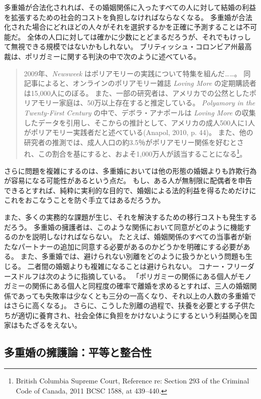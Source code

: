 \documentclass[paper=a4,book,openany]{jlreq}
\begin{document}
多重婚が合法化されれば、その婚姻関係に入ったすべての人に対して結婚の利益を拡張するための社会的コストを負担しなければならなくなる。
多重婚が合法化された場合にどれほどの人々がそれを選択するかを正確に予測することは不可能だ。
全体の人口に対しては確かに少数にとどまるだろうが、それでもけっして無視できる規模ではないかもしれない。
ブリティッシュ・コロンビア州最高裁は、ポリガミーに関する判決の中で次のように述べている。

\begin{quote}
2009年、\emph{Newsweek} はポリアモリーの実践について特集を組んだ……。
同記事によると、オンラインのポリアモリー雑誌 \emph{Loving More} の定期購読者は15,000人にのぼる。
また、一部の研究者は、アメリカでの公然としたポリアモリー家庭は、50万以上存在すると推定している。
\emph{Polyamory in the Twenty-First Century} の中で、デボラ・アナポールは \emph{Loving More} の収集したデータを引用し、そこからの推計として、アメリカの成人500人に1人がポリアモリー実践者だと述べている(Anapol, 2010, p. 44)。
また、他の研究者の推測では、成人人口の約3.5％がポリアモリー関係を好むとされ、この割合を基にすると、およそ1,000万人が該当することになる\footnote{British Columbia Supreme Court, Reference re: Section 293 of the Criminal Code of Canada, 2011 BCSC 1588, at 439--440.}。
\nocite{anapol10:_polyam_centur}
\end{quote}

さらに問題を複雑にするのは、多重婚においては他の形態の婚姻よりも詐欺行為が容易になる可能性があるという点だ。
もし、ある人が無制限に配偶者を申告できるとすれば、純粋に実利的な目的で、婚姻による法的利益を得るためだけにこれをおこなうことを防ぐ手立てはあるだろうか。

また、多くの実務的な課題が生じ、それを解決するための移行コストも発生するだろう。
多重婚の擁護者は、このような関係において同意がどのように機能するのかを説明しなければならない。
たとえば、婚姻関係のすべての当事者が新たなパートナーの追加に同意する必要があるのかどうかを明確にする必要がある。
また、多重婚では、避けられない別離をどのように扱うかという問題も生じる。
二者間の婚姻よりも複雑になることは避けられない。
コナー・フリーダースドルフは次のように指摘している。
「ポリガミーの関係にある個人がモノガミーの関係にある個人と同程度の確率で離婚を求めるとすれば、三人の婚姻関係であっても失敗率は少なくとも三分の一高くなり、それ以上の人数の多重婚ではさらに高くなる」\citep{friedersdorf15:_case_encour_polyg}。
さらに、こうした別離の過程で、扶養を必要とする子供たちが適切に養育され、社会全体に負担をかけないようにするという利益関心を国家はもたざるをえない。

\subsection{多重婚の擁護論：平等と整合性}
\end{document}
